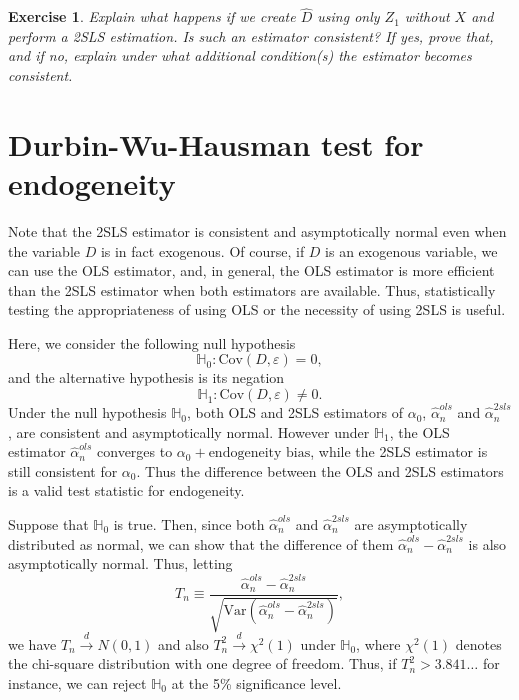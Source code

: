 \documentclass[10.5pt, A4paper, openany, uplatex]{book}
\newcommand{\mbb}{\mathbb}
\newcommand{\eps}{\varepsilon}
\newcommand{\Var}{\mathrm{Var}}
\newcommand{\Cov}{\mathrm{Cov}}
\renewcommand{\hat}{\widehat}
\newtheorem{exercise}[theorem]{Exercise}
\numberwithin{equation}{section}
\begin{document}
\begin{framed}
\begin{exercise}\upshape
	Explain what happens if we create $\hat D$ using only $Z_1$ without $X$ and perform a 2SLS estimation.
	Is such an estimator consistent? If yes, prove that, and if no, explain under what additional condition(s) the estimator becomes consistent.
\end{exercise}
\end{framed}

\section{Durbin-Wu-Hausman test for endogeneity}

Note that the 2SLS estimator is consistent and asymptotically normal even when the variable $D$ is in fact exogenous. 
Of course, if $D$ is an exogenous variable, we can use the OLS estimator, and, in general, the OLS estimator is more efficient than the 2SLS estimator when both estimators are available.
Thus, statistically testing the appropriateness of using OLS or the necessity of using 2SLS is useful.

Here, we consider the following null hypothesis
\[
	\mbb{H}_0: \Cov(D, \eps) = 0,
\]
and the alternative hypothesis is its negation
\[
	\mbb{H}_1: \Cov(D, \eps) \neq 0.
\]
Under the null hypothesis $\mbb{H}_0$, both OLS and 2SLS estimators of $\alpha_0$, $\hat \alpha_n^{ols}$ and $\hat \alpha_n^{2sls}$, are consistent and asymptotically normal.
However under $\mbb{H}_1$, the OLS estimator $\hat \alpha_n^{ols}$ converges to $\alpha_0 + \text{endogeneity bias}$, while the 2SLS estimator is still consistent for $\alpha_0$.
Thus the difference between the OLS and 2SLS estimators is a valid test statistic for endogeneity. 

Suppose that $\mbb{H}_0$ is true.
Then, since both $\hat \alpha_n^{ols}$ and $\hat \alpha_n^{2sls}$ are asymptotically distributed as normal, we can show that the difference of them $\hat \alpha_n^{ols} - \hat \alpha_n^{2sls}$ is also asymptotically normal.
Thus, letting 
\[
	T_n \equiv \frac{\hat \alpha_n^{ols} - \hat \alpha_n^{2sls}}{\sqrt{\Var(\hat \alpha_n^{ols} - \hat \alpha_n^{2sls})}},
\]	
we have $T_n \overset{d}{\to} N (0,1)$ and also $T_n^2 \overset{d}{\to} \chi^2(1)$ under $\mbb{H}_0$, where $\chi^2(1)$ denotes the chi-square distribution with one degree of freedom.
Thus, if $T_n^2 > 3.841\ldots$ for instance, we can reject $\mbb{H}_0$ at the 5\% significance level.
\end{document}
